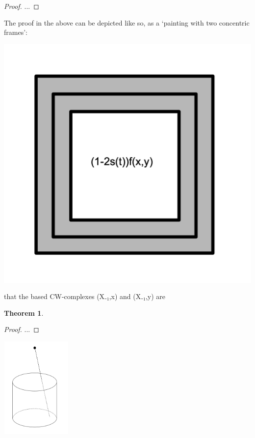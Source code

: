 \documentclass{book}
\theoremstyle{definition}
\newtheorem{theorem}{Theorem}
\begin{document}
\begin{proof}
...
\end{proof}

The proof in the above can be depicted like so, as a `painting with two concentric frames':

\begin{center}
\includegraphics[scale=0.5]{windowframe.png}
\end{center}

that the based CW-complexes (X₋₁,x) and (X₋₁,y) are 

\begin{theorem}

\end{theorem}

\begin{proof}
...
\end{proof}

\begin{center}
\includegraphics[width=3.5cm,height=5cm]{proj.png}
\end{center}
\end{document}
